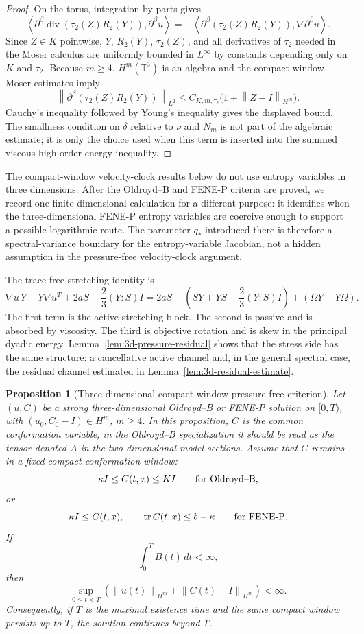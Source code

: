 \documentclass[11pt]{article}
\newtheorem{proposition}{Proposition}[section]
\newcommand{\T}{\mathbb T}
\newcommand{\tr}{\operatorname{tr}}
\newcommand{\divv}{\operatorname{div}}
\newcommand{\norm}[1]{\left\lVert #1\right\rVert}
\begin{document}
\begin{proof}
On the torus, integration by parts gives
\[
  \left\langle
  \partial^\beta\divv(\tau_2(Z)R_2(Y)),\partial^\beta u\right\rangle
  =-
  \left\langle
  \partial^\beta(\tau_2(Z)R_2(Y)),\nabla\partial^\beta u\right\rangle .
\]
Since \(Z\in K\) pointwise, \(Y\), \(R_2(Y)\), \(\tau_2(Z)\), and all derivatives
of \(\tau_2\) needed in the Moser calculus are uniformly bounded in
\(L^\infty\) by constants depending only on \(K\) and \(\tau_2\).  Because
\(m\ge4\), \(H^m(\T^3)\) is an algebra and the compact-window Moser estimates
imply
\[
  \norm{\partial^\beta(\tau_2(Z)R_2(Y))}_{L^2}
  \le C_{K,m,\tau_2}\bigl(1+\norm{Z-I}_{H^m}\bigr).
\]
Cauchy's inequality followed by Young's inequality gives the displayed bound.
The smallness condition on \(\delta\) relative to \(\nu\) and \(N_m\) is not
part of the algebraic estimate; it is only the choice used when this term is
inserted into the summed viscous high-order energy inequality.
\end{proof}

The compact-window velocity-clock results below do not use entropy variables in
three dimensions.  After the Oldroyd--B and FENE-P criteria are proved, we record
one finite-dimensional calculation for a different purpose: it identifies when
the three-dimensional FENE-P entropy variables are coercive enough to support a
possible logarithmic route.  The parameter \(q_*\) introduced there is therefore a
spectral-variance boundary for the entropy-variable Jacobian, not a hidden
assumption in the pressure-free velocity-clock argument.

The trace-free stretching identity is
\[
  \nabla u\,Y+Y\nabla u^T+2aS-\frac23(Y:S)I
  =
  2aS+\left(SY+YS-\frac23(Y:S)I\right)+(\Omega Y-Y\Omega).
\]
The first term is the active stretching block.  The second is passive and is
absorbed by viscosity.  The third is objective rotation and is skew in the
principal dyadic energy.  Lemma~\ref{lem:3d-pressure-residual} shows that the
stress side has the same structure: a cancellative active channel and, in the
general spectral case, the residual channel estimated in
Lemma~\ref{lem:3d-residual-estimate}.

\begin{proposition}[Three-dimensional compact-window pressure-free criterion]
\label{prop:3d-compact-window}
Let \((u,C)\) be a strong three-dimensional Oldroyd--B or FENE-P solution on
\([0,T)\), with \((u_0,C_0-I)\in H^m\), \(m\ge4\).  In this proposition, \(C\) is the
common conformation variable; in the Oldroyd--B specialization it should be read
as the tensor denoted \(A\) in the two-dimensional model sections.  Assume that \(C\) remains in a fixed
compact conformation window:
\[
  \kappa I\le C(t,x)\le KI
  \qquad\hbox{for Oldroyd--B},
\]
or
\[
  \kappa I\le C(t,x),\qquad \tr C(t,x)\le b-\kappa
  \qquad\hbox{for FENE-P}.
\]
If
\[
  \int_0^T B(t)\,dt<\infty,
\]
then
\[
  \sup_{0\le t<T}\left(\norm{u(t)}_{H^m}+\norm{C(t)-I}_{H^m}\right)<\infty .
\]
Consequently, if \(T\) is the maximal existence time and the same compact
window persists up to \(T\), the solution continues beyond \(T\).
\end{proposition}
\end{document}
